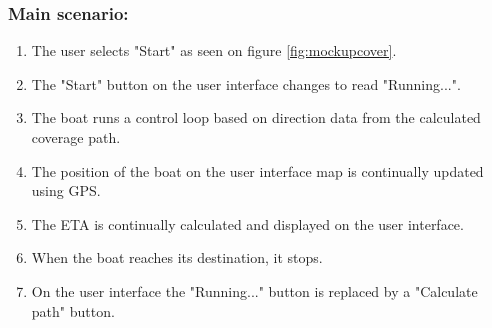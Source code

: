 \begin{framed}
	\subsubsection*{Main scenario:}
	\begin{enumerate}
		\item The user selects "Start" as seen on figure \ref{fig:mockupcover}.
		\item The "Start" button on the user interface changes to read "Running...".
		\item The boat runs a control loop based on direction data from the calculated coverage path.
		\item The position of the boat on the user interface map is continually updated using GPS.
		\item The ETA is continually calculated and displayed on the user interface.
		\item When the boat reaches its destination, it stops.
		\item On the user interface the "Running..." button is replaced by a "Calculate path" button.
	\end{enumerate}	
\end{framed}	

